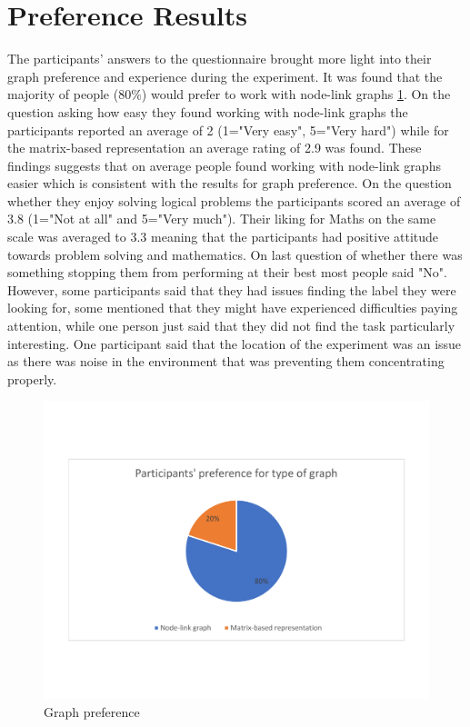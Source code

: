 \documentclass{l4proj}
\begin{document}
\section{Preference Results} 

The participants' answers to the questionnaire brought more light into their graph preference and experience during the experiment. It was found that the majority of people (80\%) would prefer to work with node-link graphs \ref{preference}. On the question asking how easy they found working with node-link graphs the participants reported an average of 2 (1="Very easy", 5="Very hard") while for the matrix-based representation an average rating of 2.9 was found. These findings suggests that on average people found working with node-link graphs easier which is consistent with the results for graph preference. On the question whether they enjoy solving logical problems the participants scored an average of 3.8 (1="Not at all" and 5="Very much"). Their liking for Maths on the same scale was averaged to 3.3 meaning that the participants had positive attitude towards problem solving and mathematics. On last question of whether there was something stopping them from performing at their best most people said "No". However, some participants said that they had issues finding the label they were looking for, some mentioned that they might have experienced difficulties paying attention, while one person just said that they did not find the task particularly interesting. One participant said that the location of the experiment was an issue as there was noise in the environment that was preventing them concentrating properly. 

\begin{figure}[H]
\centering
\includegraphics[width=15cm]{preference.pdf}
\caption{Graph preference}
\label{preference}
\end{figure}
\end{document}
